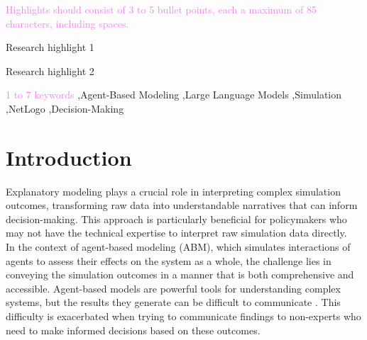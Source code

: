 \documentclass[preprint,12pt]{elsarticle}
\begin{document}
\begin{frontmatter}
\begin{highlights}
\item \textcolor{violet}{Highlights should consist of 3 to 5 bullet points, each a maximum of 85 characters, including spaces.}
\item Research highlight 1
\item Research highlight 2
\end{highlights}

\begin{keyword}
\textcolor{violet}{1 to 7 keywords} \sep Agent-Based Modeling \sep Large Language Models \sep Simulation  \sep NetLogo \sep Decision-Making
\end{keyword}
\end{frontmatter}



\section{Introduction}
\label{sec1}

Explanatory modeling plays a crucial role in interpreting complex simulation outcomes, transforming raw data into understandable narratives that can inform decision-making. This approach is particularly beneficial for policymakers who may not have the technical expertise to interpret raw simulation data directly.\\

In the context of agent-based modeling (ABM), which simulates interactions of agents to assess their effects on the system as a whole, the challenge lies in conveying the simulation outcomes in a manner that is both comprehensive and accessible. Agent-based models are powerful tools for understanding complex systems, but the results they generate can be difficult to communicate \cite{Sun2016}. This difficulty is exacerbated when trying to communicate findings to non-experts who need to make informed decisions based on these outcomes.\\
\end{document}
